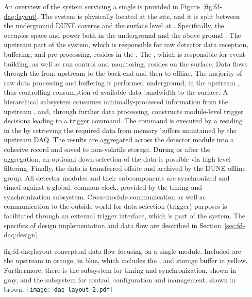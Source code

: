 An overview of the    system 
servicing a single 
 is
provided in Figure~\ref{fig:fd-daq:layout}. The system is
physically located at the  site, and it is split between the
underground DUNE caverns and the surface level at . Specifically, the  occupies space and
power both in the underground  and the above ground .
The upstream part of the system, which is responsible for
raw detector data reception, buffering, and pre-processing, resides in the .
The ,
which is responsible for
event-building, as well as run control and monitoring, resides on the
surface.
Data flows through the  from 
upstream to the back-end and then to offline. The majority
of raw data processing and buffering is performed underground, in the
upstream , thus controlling consumption of available data bandwidth  to the surface. A
hierarchical  subsystem consumes minimally-processed
information from the upstream , and, through further data processing, 
constructs module-level trigger decisions leading to a trigger command.
The command is executed by a  residing in the 
by retrieving the required data from memory buffers maintained by the upstream DAQ.
The results are aggregated across the detector module into a cohesive record and saved to non-volatile storage.
During or after the aggregation, an optional down-selection of the data is possible via
high level filtering.
Finally, the data is  transferred offsite and archived by the DUNE offline group.
All
detector modules and their subcomponents are synchronized and timed against a global,
common clock, provided by the timing and synchronization
subsystem. Cross-module communication as well as communication
to the outside world for data selection (trigger) purposes is facilitated
through an external trigger interface, which is part of the 
system. The
specifics of design implementation and data flow are described in Section~\ref{sec:fd-daq:design}.

\begin{dunefigure}{fig:fd-daq:layout}{ conceptual data flow focusing
    on a single \nominalmodsize module. Included are the upstream
     in orange,  in blue, 
    which includes the ,  and storage buffer
    in yellow. 
    Furthermore, there is the subsystem for timing and
    synchronization, shown in gray, and the subsystem for control,
    configuration and management, shown in brown.
  }
  \texttt{[image: daq-layout-2.pdf]}
\end{dunefigure}


